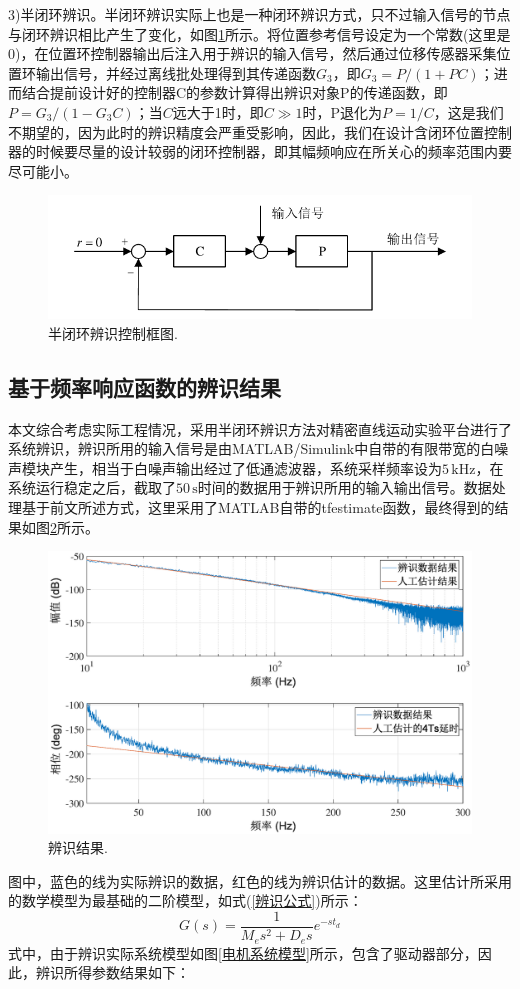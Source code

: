 3)半闭环辨识。半闭环辨识实际上也是一种闭环辨识方式，只不过输入信号的节点与闭环辨识相比产生了变化，如图\ref{半闭环辨识控制框图}所示。将位置参考信号设定为一个常数(这里是0)，在位置环控制器输出后注入用于辨识的输入信号，然后通过位移传感器采集位置环输出信号，并经过离线批处理得到其传递函数$G_3$，即$G_3=P/(1+PC)$；进而结合提前设计好的控制器C的参数计算得出辨识对象P的传递函数，即$P=G_3/(1-G_3C)$；当$C$远大于1时，即$C\gg1$时，P退化为$P=1/C$，这是我们不期望的，因为此时的辨识精度会严重受影响，因此，我们在设计含闭环位置控制器的时候要尽量的设计较弱的闭环控制器，即其幅频响应在所关心的频率范围内要尽可能小。
\begin{figure}[H]
	\centering
	\includegraphics[width=12cm]{figures/半闭环测试.pdf}
	\caption{半闭环辨识控制框图.}
	\label{半闭环辨识控制框图}
\end{figure}
\subsection{基于频率响应函数的辨识结果}
本文综合考虑实际工程情况，采用半闭环辨识方法对精密直线运动实验平台进行了系统辨识，辨识所用的输入信号是由MATLAB/Simulink中自带的有限带宽的白噪声模块产生，相当于白噪声输出经过了低通滤波器，系统采样频率设为$5\,\text{kHz}$，在系统运行稳定之后，截取了$50\,\text{s}$时间的数据用于辨识所用的输入输出信号。数据处理基于前文所述方式，这里采用了MATLAB自带的tfestimate函数，最终得到的结果如图\ref{辨识结果}所示。
\begin{figure}[H]
	\centering
	\includegraphics[width=12cm]{figures/辨识结果}
	\caption{辨识结果.}
	\label{辨识结果}
\end{figure}
图中，蓝色的线为实际辨识的数据，红色的线为辨识估计的数据。这里估计所采用的数学模型为最基础的二阶模型，如式(\ref{辨识公式})所示：
\begin{equation}
\label{辨识公式}
G(s)=\frac{1}{M_es^2+D_es}e^{-st_d}
\end{equation}
式中，由于辨识实际系统模型如图\ref{电机系统模型}所示，包含了驱动器部分，因此，辨识所得参数结果如下：

